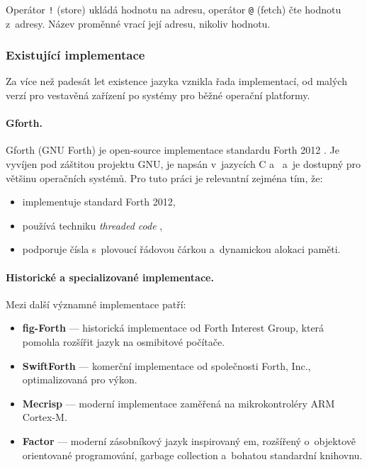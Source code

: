 Operátor \texttt{!} (store) ukládá hodnotu na adresu, operátor
\texttt{@} (fetch) čte hodnotu z~adresy. Název proměnné vrací
její adresu, nikoliv hodnotu.


\subsubsection{Existující implementace}
\label{sec:forth-implementace}

Za více než padesát let existence jazyka \Forth{} vznikla řada
implementací, od malých verzí pro vestavěná zařízení po systémy
pro běžné operační platformy.

\paragraph{Gforth.}
Gforth (GNU Forth) je open-source implementace standardu
Forth 2012 \autocite{gforth}. Je vyvíjen pod záštitou projektu GNU,
je napsán v~jazycích C a~\Forth{} a~je dostupný pro většinu
operačních systémů. Pro tuto práci je relevantní zejména tím, že:

\begin{itemize}
		\item implementuje standard Forth 2012,
		\item používá techniku \emph{threaded code} \autocite{ertl2002},
		\item podporuje čísla s~plovoucí řádovou čárkou a~dynamickou
		      alokaci paměti.
\end{itemize}

\paragraph{Historické a specializované implementace.}
Mezi další významné implementace patří:

\begin{itemize}
	\item \textbf{fig-Forth} --- historická implementace od Forth Interest
	      Group, která pomohla rozšířit jazyk na osmibitové počítače.
	\item \textbf{SwiftForth} --- komerční implementace od společnosti
	      Forth, Inc., optimalizovaná pro výkon.
	\item \textbf{Mecrisp} --- moderní implementace zaměřená na
	      mikrokontroléry ARM Cortex-M.
	\item \textbf{Factor} --- moderní zásobníkový jazyk inspirovaný
	      \Forth{}em, rozšířený o~objektově orientované programování,
	      garbage collection a~bohatou standardní knihovnu.
\end{itemize}


